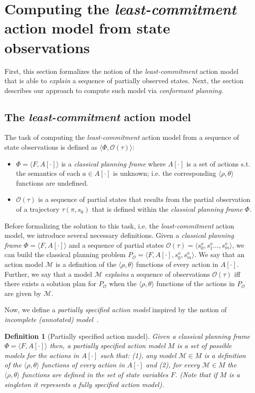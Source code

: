 \documentclass{article}
\newcommand{\tup}[1]{{\langle #1 \rangle}}
\newtheorem{definition}[theorem]{Definition}
\begin{document}
\section{Computing the {\em least-commitment} action model from state observations}
First, this section formalizes the notion of the {\em least-commitment} action model that is able to {\em explain} a sequence of partially observed states. Next, the section describes our approach to compute such model via {\em conformant planning}. 

\subsection{The {\em least-commitment} action model}
The task of computing the {\em least-commitment} action model from a sequence of state observations is defined as $\tup{\Phi,\mathcal{O}(\tau)}$:
\begin{itemize}
\item $\Phi=\tup{F,A[\cdot]}$ is a {\em classical planning frame} where $A[\cdot]$ is a set of actions s.t. the semantics of each $a\in A[\cdot]$ is unknown; i.e. the corresponding $\tup{\rho,\theta}$ functions are undefined. 
\item $\mathcal{O}(\tau)$ is a sequence of partial states that results from the partial observation of a trajectory $\tau(\pi,s_0)$ that is defined within the {\em classical planning frame} $\Phi$.
\end{itemize}

Before formalizing the solution to this task, i.e. the {\em least-commitment} action model, we introduce several necessary definitions. Given a {\em classical planning frame} $\Phi=\tup{F,A[\cdot]}$ and a sequence of partial states $\mathcal{O}(\tau)=\tup{s_0^o,s_1^o \ldots , s_m^o}$, we can build the classical planning problem $P_\mathcal{O}=\tup{F,A[\cdot],s_0^o,s_m^o}$. We say that an action model $\mathcal{M}$ is a definition of the $\tup{\rho,\theta}$ functions of every action in $A[\cdot]$. Further, we say that a model $\mathcal{M}$ {\em explains} a sequence of observations $\mathcal{O}(\tau)$ iff there exists a solution plan for $P_\mathcal{O}$ when the $\tup{\rho,\theta}$ functions of the actions in $P_\mathcal{O}$ are given by $\mathcal{M}$.

Now, we define a {\em partially specified action model} inspired by the notion of {\em incomplete (annotated) model}~\cite{sreedharan2018handling}.
\begin{definition}[Partially specified action model]
Given a {\em classical planning frame} $\Phi=\tup{F,A[\cdot]}$ then, a {\em partially specified action model} $M$ is a set of possible models for the actions in $A[\cdot]$ such that: (1), any model $\mathcal{M}\in M$ is a definition of the $\tup{\rho,\theta}$ functions of every action in $A[\cdot]$ and (2), for every $\mathcal{M}\in M$ the $\tup{\rho,\theta}$ functions are defined in the set of state variables $F$. (Note that if $M$ is a singleton it represents a {\em fully specified action model}).
\end{definition}
\end{document}
